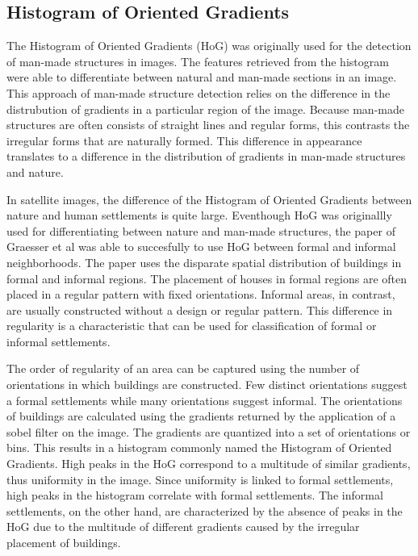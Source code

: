 \subsection{Histogram of Oriented Gradients}


The Histogram of Oriented Gradients (HoG) was originally used for the detection of
man-made structures in images. The features retrieved from the histogram were
able to differentiate between natural and man-made sections in an image. This
approach of man-made structure detection relies on the difference in the
distrubution of gradients in a particular region of the image. Because man-made
structures are often consists of straight lines and regular forms, this
contrasts the irregular forms that are naturally formed. This difference in
appearance translates to a difference in the distribution of gradients in
man-made structures and nature.

In satellite images, the difference of the Histogram of Oriented Gradients
between nature and human settlements is quite large. Eventhough HoG was
originallly used for differentiating between nature and man-made structures,
the paper of Graesser et al was able to succesfully to use HoG between formal
and informal neighborhoods. The paper uses the disparate spatial distribution of
buildings in formal and informal regions. The
placement of houses in formal regions are often placed in a regular pattern
with fixed orientations. Informal areas, in contrast, are usually constructed
without a design or regular pattern. This difference in regularity is
a characteristic that can be used for classification of formal or informal
settlements.

The order of regularity of an area can be captured using the number of
orientations in which buildings are constructed. Few distinct orientations suggest
a formal settlements while many orientations suggest informal. The orientations
of buildings are calculated using the gradients returned by the application of
a sobel filter on the image. The gradients are quantized into a set of
orientations or bins. This results in a histogram commonly named the Histogram
of Oriented Gradients. High peaks in the HoG correspond to a multitude of
similar gradients, thus uniformity in the image. Since uniformity is linked
to formal settlements, high peaks in the histogram correlate with formal
settlements. The informal settlements, on the other hand, are characterized by
the absence of peaks in the HoG due to the multitude of different gradients
caused by the irregular placement of buildings.

